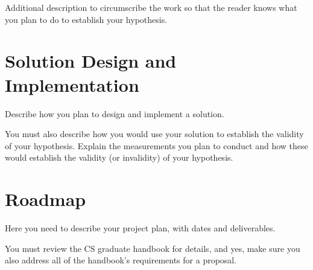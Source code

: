Additional description to circumscribe the work so that the reader
knows what you plan to do to establish your hypothesis.

\section{Solution Design and Implementation}
Describe how you plan to design and implement a solution. 

You must also describe how you would use your solution to establish the validity of your hypothesis. Explain the measurements you plan to conduct and how these would establish the validity (or invalidity) of your hypothesis.

\section{Roadmap}

Here you need to describe your project plan, with dates and deliverables. 

You must review the CS graduate handbook for details, and yes, make
sure you also address all of the handbook's requirements for a
proposal.



\singlespacing





